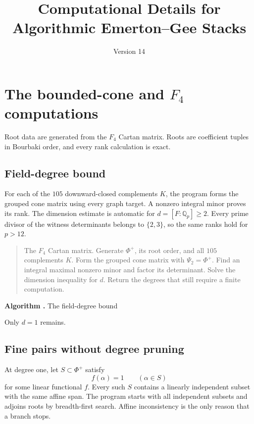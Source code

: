 \documentclass[11pt]{amsart}
\title{Computational Details for Algorithmic Emerton--Gee Stacks}
\date{Version 14}
\newcommand{\Q}{\mathbb Q}
\newcommand{\algorithmcaption}[2]{%
  \refstepcounter{figure}\label{#2}%
  \begin{center}\small\textbf{Algorithm \thefigure.} #1\end{center}}
\begin{document}
\maketitle
\tableofcontents

\section{The bounded-cone and \texorpdfstring{$F_4$}{F4} computations}
\label{sec:f4}

Root data are generated from the $F_4$ Cartan matrix.  Roots are coefficient
tuples in Bourbaki order, and every rank calculation is exact.

\subsection{Field-degree bound}

For each of the $105$ downward-closed complements $K$, the program forms the
grouped cone matrix using every graph target.  A nonzero integral minor proves
its rank.  The dimension estimate is automatic for $d=[F:\Q_p]\ge2$.
Every prime divisor of the witness determinants belongs to $\{2,3\}$, so the
same ranks hold for $p>12$.

\begin{quote}
\begin{algorithmic}[1]
\Require The $F_4$ Cartan matrix.
\State Generate $\Phi^+$, its root order, and all $105$ complements $K$.
  \State Form the grouped cone matrix with $\Psi_2=\Phi^+$.
  \State Find an integral maximal nonzero minor and factor its determinant.
  \State Solve the dimension inequality for $d$.
\EndFor
\State Return the degrees that still require a finite computation.
\end{algorithmic}
\end{quote}
\algorithmcaption{The field-degree bound}{alg:f4-degree-bound}

Only $d=1$ remains.

\subsection{Fine pairs without degree pruning}

At degree one, let $S\subset\Phi^+$ satisfy
\[
f(\alpha)=1\qquad(\alpha\in S)
\]
for some linear functional $f$.  Every such $S$ contains a linearly independent
subset with the same affine span.  The program starts with all independent
subsets and adjoins roots by breadth-first search.  Affine inconsistency is the
only reason that a branch stops.
\end{document}
